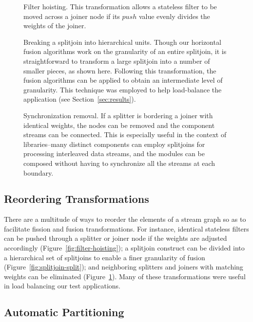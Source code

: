 \begin{figure}
\centering
{}
\caption{\protect\small Filter hoisting.  This transformation allows a
stateless filter to be moved across a joiner node if its $push$ value
evenly divides the weights of the joiner.
\protect\label{fig:filter-hoisting}}
\vspace{12pt}
\caption{\protect\small Breaking a splitjoin into hierarchical units.
Though our horizontal fusion algorithms work on the granularity of an
entire splitjoin, it is straightforward to transform a large splitjoin
into a number of smaller pieces, as shown here.  Following this
transformation, the fusion algorithms can be applied to obtain an
intermediate level of granularity.  This technique was employed to
help load-balance the \Radar application (see Section~\ref{sec:results}).
\protect\label{fig:splitjoin-split}}
\vspace{12pt}
\caption{\protect\small Synchronization removal.  If a splitter is
bordering a joiner with identical weights, the nodes can be removed
and the component streams can be connected.  This is especially useful
in the context of libraries--many distinct components can employ
splitjoins for processing interleaved data streams, and the modules
can be composed without having to synchronize all the streams at each
boundary.  \protect\label{fig:sync-removal}}
\vspace{-6pt}
\end{figure}

\subsection{Reordering Transformations}
There are a multitude of ways to reorder the elements of a stream
graph so as to facilitate fission and fusion transformations.  For
instance, identical stateless filters can be pushed through a splitter
or joiner node if the weights are adjusted accordingly
(Figure~\ref{fig:filter-hoisting}); a splitjoin construct can be
divided into a hierarchical set of splitjoins to enable a finer
granularity of fusion (Figure~\ref{fig:splitjoin-split}); and
neighboring splitters and joiners with matching weights can be
eliminated (Figure~\ref{fig:sync-removal}).  Many of these
transformations were useful in load balancing our test applications.

\subsection{Automatic Partitioning}

